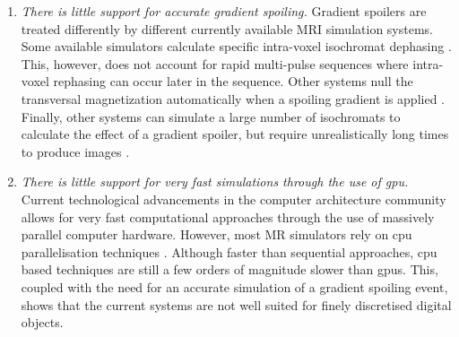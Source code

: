 \begin{enumerate}

    \item \textit{There is little support for accurate gradient spoiling.}
    Gradient spoilers are treated differently by different currently available MRI simulation systems.
    Some available simulators calculate specific intra-voxel isochromat dephasing \cite{Drobnjak2006} \cite{Jochimsen2006}.
    This, however, does not account for rapid multi-pulse sequences where intra-voxel rephasing can occur later in the sequence.
    Other systems null the transversal magnetization automatically when a spoiling gradient is applied \cite{Benoit-Cattin2005} \cite{Liu2017}.
    Finally, other systems can simulate a large number of isochromats to calculate the effect of a gradient spoiler, but require unrealistically long times to produce images \cite{Stocker2010}.
    
    
    
    \item \textit{There is little support for very fast simulations through the use of \ac{gpu}.}
    Current technological advancements in the computer architecture community allows for very fast computational approaches through the use of massively parallel computer hardware.
    However, most MR simulators rely on \ac{cpu} parallelisation techniques \cite{Drobnjak2006} \cite{Stocker2010}.
    Although faster than sequential approaches, \ac{cpu} based techniques are still a few orders of magnitude slower than \ac{gpu}s.
    This, coupled with the need for an accurate simulation of a gradient spoiling event, shows that the current systems are not well suited for finely discretised digital objects. \\


\end{enumerate}

